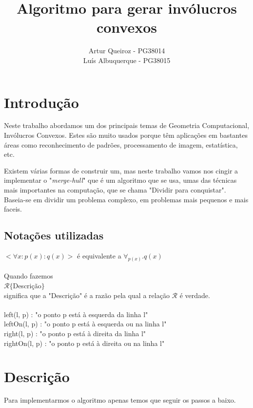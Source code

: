 \documentclass[11pt]{article}
\title{Algoritmo para gerar invólucros convexos}
\author{Artur Queiroz - PG38014\\Luís Albuquerque - PG38015}
\begin{document}
\maketitle

\section{Introdução}
Neste trabalho abordamos um dos principais temas de Geometria 
Computacional, Invólucros Convexos.
Estes são muito usados porque têm aplicações em bastantes áreas
como reconhecimento de padrões, processamento de imagem, 
estatística, etc.

Existem várias formas de construir um, mas neste trabalho vamos
nos cingir a implementar o "\textit{merge-hull}"
que é um algoritmo que se usa, umas das técnicas mais importantes
na computação, que se chama "Dividir para conquistar".
Baseia-se em dividir um problema complexo, em problemas mais 
pequenos e mais faceis.

\subsection{Notações utilizadas}
$<\forall x : p(x) : q(x)>$ é equivalente a $\forall_{p(x)} . q(x)$\\ \\
Quando fazemos\\
$\mathcal{R}\{$Descrição$\}$\\
significa que a "Descrição" é a razão pela qual a relação $\mathcal{R}$
é verdade.\\ \\
left(l, p) : "o ponto p está à esquerda da linha l"\\
leftOn(l, p) : "o ponto p está à esquerda ou na linha l"\\
right(l, p) : "o ponto p está à direita da linha l"\\
rightOn(l, p) : "o ponto p está à direita ou na linha l"\\


\section{Descrição}
Para implementarmos o algoritmo apenas temos que seguir os passos
a baixo.
\end{document}
